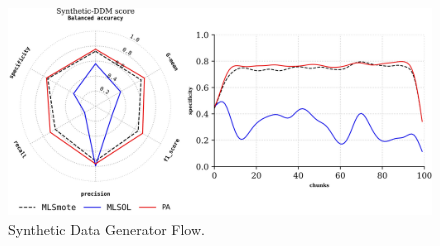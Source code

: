 \begin{figure}[!ht]
	\centering
	\includegraphics[width=1\linewidth]{4_Taxonomy/figures/exp_6.png}
	\caption{Synthetic Data Generator Flow.}
	\label{fig:4_first_proposal_result_exp_6}
\end{figure}


